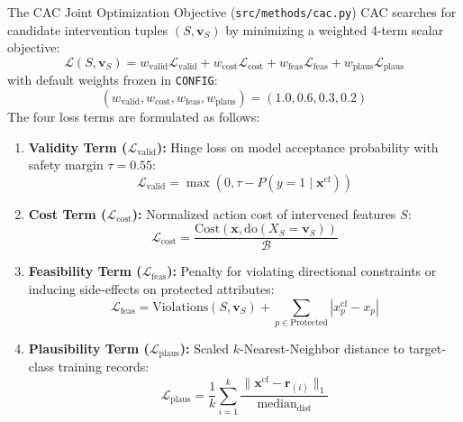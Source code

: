 \documentclass[11pt,a4paper]{article}
\begin{document}
\begin{parentconcept}{The CAC Joint Optimization Objective (\texttt{src/methods/cac.py})}
CAC searches for candidate intervention tuples $(S, \mathbf{v}_S)$ by minimizing a weighted 4-term scalar objective:
\begin{equation}
\mathcal{L}(S, \mathbf{v}_S) = w_{\text{valid}} \mathcal{L}_{\text{valid}} + w_{\text{cost}} \mathcal{L}_{\text{cost}} + w_{\text{feas}} \mathcal{L}_{\text{feas}} + w_{\text{plaus}} \mathcal{L}_{\text{plaus}}
\end{equation}
with default weights frozen in \texttt{CONFIG}:
\begin{equation}
(w_{\text{valid}}, w_{\text{cost}}, w_{\text{feas}}, w_{\text{plaus}}) = (1.0, 0.6, 0.3, 0.2)
\end{equation}
The four loss terms are formulated as follows:
\begin{enumerate}[leftmargin=1.5em]
    \item \textbf{Validity Term ($\mathcal{L}_{\text{valid}}$):} Hinge loss on model acceptance probability with safety margin $\tau = 0.55$:
    \begin{equation}
    \mathcal{L}_{\text{valid}} = \max\left(0, \tau - P(y=1 \mid \mathbf{x}^{\text{cf}})\right)
    \end{equation}
    \item \textbf{Cost Term ($\mathcal{L}_{\text{cost}}$):} Normalized action cost of intervened features $S$:
    \begin{equation}
    \mathcal{L}_{\text{cost}} = \frac{\mathrm{Cost}(\mathbf{x}, \mathrm{do}(X_S = \mathbf{v}_S))}{\mathcal{B}}
    \end{equation}
    \item \textbf{Feasibility Term ($\mathcal{L}_{\text{feas}}$):} Penalty for violating directional constraints or inducing side-effects on protected attributes:
    \begin{equation}
    \mathcal{L}_{\text{feas}} = \mathrm{Violations}(S, \mathbf{v}_S) + \sum_{p \in \text{Protected}} |x_p^{\text{cf}} - x_p|
    \end{equation}
    \item \textbf{Plausibility Term ($\mathcal{L}_{\text{plaus}}$):} Scaled $k$-Nearest-Neighbor distance to target-class training records:
    \begin{equation}
    \mathcal{L}_{\text{plaus}} = \frac{1}{k} \sum_{i=1}^k \frac{\|\mathbf{x}^{\text{cf}} - \mathbf{r}_{(i)}\|_1}{\mathrm{median}_{\text{dist}}}
    \end{equation}
\end{enumerate}
\end{parentconcept}
\end{document}
